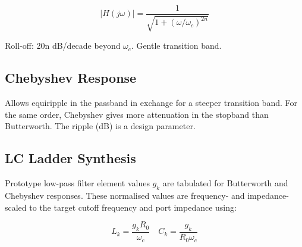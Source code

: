 				
\[|H(j\omega)| = \dfrac{1}{\sqrt{1+(\omega/\omega_c)^{2n}}}\]

				

Roll-off: 20n dB/decade beyond $\omega_c$. Gentle transition band.

				

\subsection{Chebyshev Response}

				

Allows equiripple in the passband in exchange for a steeper transition band. For the same order, Chebyshev gives more attenuation in the stopband than Butterworth. The ripple (dB) is a design parameter.

				

\subsection{LC Ladder Synthesis}

				


				

Prototype low-pass filter element values $g_k$ are tabulated for Butterworth and Chebyshev responses. These normalised values are frequency- and impedance-scaled to the target cutoff frequency and port impedance using:

				
\[L_k = \dfrac{g_k R_0}{\omega_c}\quad C_k = \dfrac{g_k}{R_0 \omega_c}\]



